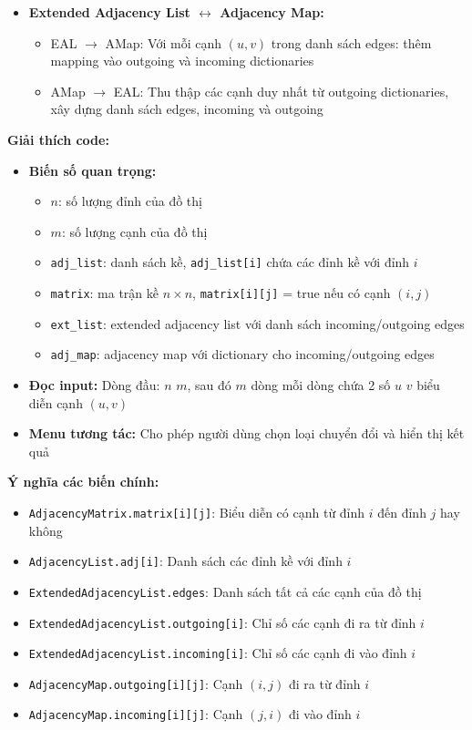 \documentclass{article}
\begin{document}
\begin{itemize}
\begin{itemize}
    \end{itemize}
    \item \textbf{Extended Adjacency List $\leftrightarrow$ Adjacency Map:}
    \begin{itemize}
        \item EAL $\to$ AMap: Với mỗi cạnh $(u,v)$ trong danh sách edges: thêm mapping vào outgoing và incoming dictionaries
        \item AMap $\to$ EAL: Thu thập các cạnh duy nhất từ outgoing dictionaries, xây dựng danh sách edges, incoming và outgoing
    \end{itemize}
\end{itemize}

\textbf{Giải thích code:}

\begin{itemize}
    \item \textbf{Biến số quan trọng:}
    \begin{itemize}
        \item $n$: số lượng đỉnh của đồ thị
        \item $m$: số lượng cạnh của đồ thị
        \item \texttt{adj\_list}: danh sách kề, \texttt{adj\_list[i]} chứa các đỉnh kề với đỉnh $i$
        \item \texttt{matrix}: ma trận kề $n \times n$, \texttt{matrix[i][j]} = true nếu có cạnh $(i,j)$
        \item \texttt{ext\_list}: extended adjacency list với danh sách incoming/outgoing edges
        \item \texttt{adj\_map}: adjacency map với dictionary cho incoming/outgoing edges
    \end{itemize}
    \item \textbf{Đọc input:} Dòng đầu: $n$ $m$, sau đó $m$ dòng mỗi dòng chứa 2 số $u$ $v$ biểu diễn cạnh $(u,v)$
    \item \textbf{Menu tương tác:} Cho phép người dùng chọn loại chuyển đổi và hiển thị kết quả
\end{itemize}

\textbf{Ý nghĩa các biến chính:}

\begin{itemize}
    \item \texttt{AdjacencyMatrix.matrix[i][j]}: Biểu diễn có cạnh từ đỉnh $i$ đến đỉnh $j$ hay không
    \item \texttt{AdjacencyList.adj[i]}: Danh sách các đỉnh kề với đỉnh $i$
    \item \texttt{ExtendedAdjacencyList.edges}: Danh sách tất cả các cạnh của đồ thị
    \item \texttt{ExtendedAdjacencyList.outgoing[i]}: Chỉ số các cạnh đi ra từ đỉnh $i$
    \item \texttt{ExtendedAdjacencyList.incoming[i]}: Chỉ số các cạnh đi vào đỉnh $i$
    \item \texttt{AdjacencyMap.outgoing[i][j]}: Cạnh $(i,j)$ đi ra từ đỉnh $i$
    \item \texttt{AdjacencyMap.incoming[i][j]}: Cạnh $(j,i)$ đi vào đỉnh $i$
\end{itemize}
\end{document}
